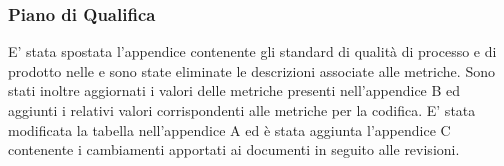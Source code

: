 	\subsubsection*{Piano di Qualifica}
	E' stata spostata l’appendice contenente gli standard di qualità di processo e di prodotto nelle \NdP{} e sono state eliminate le descrizioni associate alle metriche. Sono stati inoltre aggiornati i valori delle metriche presenti nell’appendice B ed aggiunti i relativi valori corrispondenti alle metriche per la codifica. E' stata modificata la tabella nell’appendice A ed è stata aggiunta l'appendice C contenente i cambiamenti apportati ai documenti in seguito alle revisioni.
